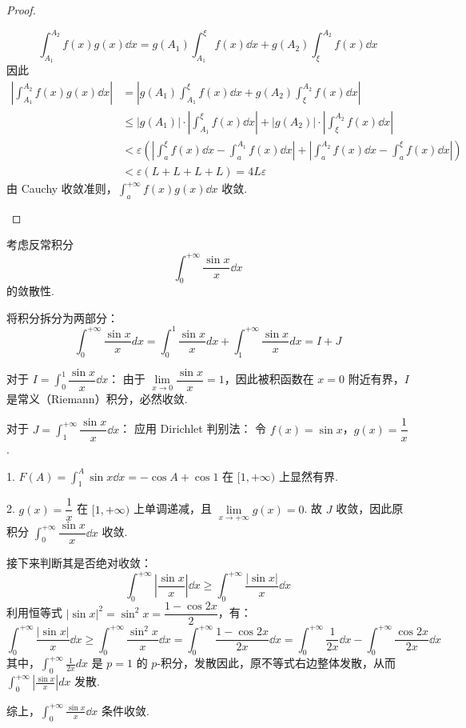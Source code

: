 \begin{proof}
\begin{enumerate}
		\[
		\int_{A_1}^{A_2} f(x)g(x)\dd x = g(A_1)\int_{A_1}^\xi f(x)\dd x + g(A_2)\int_\xi^{A_2} f(x)\dd x
		\]
		因此
		\[
		\begin{aligned}
			\left| \int_{A_1}^{A_2} f(x)g(x)\dd x \right|
			&= \left| g(A_1)\int_{A_1}^\xi f(x)\dd x + g(A_2)\int_\xi^{A_2} f(x)\dd x \right| \\
			&\le |g(A_1)| \cdot \left| \int_{A_1}^\xi f(x)\dd x \right| + |g(A_2)| \cdot \left| \int_\xi^{A_2} f(x)\dd x \right| \\
			&< \varepsilon \left( \left| \int_a^\xi f(x)\dd x - \int_a^{A_1} f(x)\dd x \right| + \left| \int_a^{A_2} f(x)\dd x - \int_a^\xi f(x)\dd x \right| \right) \\
			&< \varepsilon (L + L + L + L) = 4L\varepsilon
		\end{aligned}
		\]
		由 Cauchy 收敛准则，$\displaystyle\int_a^{+\infty} f(x)g(x)\dd x$ 收敛.
	\end{enumerate}
	
	
\end{proof}
\begin{example}
	考虑反常积分 $$ \int_0^{+\infty} \frac{\sin x}{x} \dd x$$ 的敛散性.
\end{example}
\begin{solution}
	将积分拆分为两部分：
	\[
	\int_0^{+\infty} \frac{\sin x}{x} dx = \int_0^1 \frac{\sin x}{x} dx + \int_1^{+\infty} \frac{\sin x}{x} dx = I + J
	\]
	
	对于 $I = \displaystyle\int_0^1 \dfrac{\sin x}{x} \dd x$：
	由于 $\lim\limits_{x\to0} \dfrac{\sin x}{x} = 1$，因此被积函数在 $x=0$ 附近有界，$I$ 是常义（Riemann）积分，必然收敛.
	
	对于 $J = \displaystyle\int_1^{+\infty} \dfrac{\sin x}{x} \dd x$：
	应用 Dirichlet 判别法：
	令 $f(x) = \sin x$，$g(x) = \dfrac{1}{x}$.
	
	1.  $F(A) = \displaystyle\int_1^A \sin x \dd x = -\cos A + \cos 1$ 在 $[1,+\infty)$ 上显然有界.
	
	2.  $g(x) = \dfrac{1}{x}$ 在 $[1,+\infty)$ 上单调递减，且 $\lim\limits_{x\to+\infty} g(x) = 0$.
	故 $J$ 收敛，因此原积分 $\displaystyle \int_0^{+\infty} \dfrac{\sin x}{x} \dd x$ 收敛.
	
	接下来判断其是否绝对收敛：
	\[
	\int_0^{+\infty} \left| \frac{\sin x}{x} \right| \dd x \ge \int_0^{+\infty} \frac{|\sin x|}{x} \dd x
	\]
	利用恒等式 $|\sin x|^2 = \sin^2 x = \dfrac{1-\cos 2x}{2}$，有：
	\[
	\int_0^{+\infty} \frac{|\sin x|}{x} \dd x \ge \int_0^{+\infty} \frac{\sin^2 x}{x} \dd x = \int_0^{+\infty} \frac{1-\cos 2x}{2x} \dd x = \int_0^{+\infty} \frac{1}{2x} \dd x - \int_0^{+\infty} \frac{\cos 2x}{2x} \dd x
	\]
	其中，$\displaystyle \int_0^{+\infty} \frac{1}{2x} dx$ 是 $p=1$ 的 $p$-积分，发散因此，原不等式右边整体发散，从而 $\displaystyle \int_0^{+\infty} \left| \frac{\sin x}{x} \right| dx$ 发散.
	
	综上，$\displaystyle \int_0^{+\infty} \frac{\sin x}{x} \dd x$ 条件收敛.
\end{solution}
